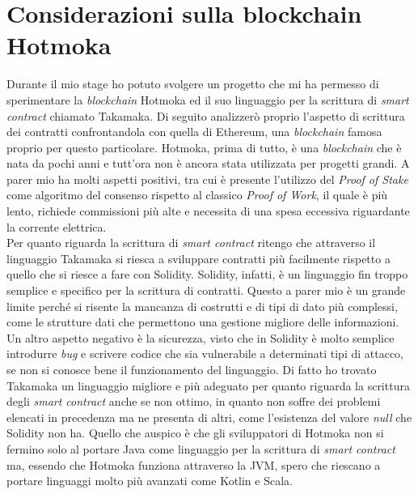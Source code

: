 
\section{Considerazioni sulla blockchain Hotmoka}
Durante il mio stage ho potuto svolgere un progetto che mi ha permesso di sperimentare la \textit{blockchain} Hotmoka ed il suo linguaggio per la scrittura di \textit{smart contract} chiamato Takamaka. Di seguito analizzerò proprio l'aspetto di scrittura dei contratti confrontandola con quella di Ethereum, una \textit{blockchain} famosa proprio per questo particolare. 
Hotmoka, prima di tutto, è una \textit{blockchain} che è nata da pochi anni e tutt'ora non è ancora stata utilizzata per progetti grandi. A parer mio ha molti aspetti positivi, tra cui è presente l'utilizzo del \textit{Proof of Stake} come algoritmo del consenso rispetto al classico \textit{Proof of Work}, il quale è più lento, richiede commissioni più alte e necessita di una spesa eccessiva riguardante la corrente elettrica. \\

Per quanto riguarda la scrittura di \textit{smart contract} ritengo che attraverso il linguaggio Takamaka si riesca a sviluppare contratti più facilmente rispetto a quello che si riesce a fare con Solidity. Solidity, infatti, è un linguaggio fin troppo semplice e specifico per la scrittura di contratti. Questo a parer mio è un grande limite perché si risente la mancanza di costrutti e di tipi di dato più complessi, come le strutture dati che permettono una gestione migliore delle informazioni. Un altro aspetto negativo è la sicurezza, visto che in Solidity è molto semplice introdurre \textit{bug} e scrivere codice che sia vulnerabile a determinati tipi di attacco, se non si conosce bene il funzionamento del linguaggio.
Di fatto ho trovato Takamaka un linguaggio migliore e più adeguato per quanto riguarda la scrittura degli \textit{smart contract} anche se non ottimo, in quanto non soffre dei problemi elencati in precedenza ma ne presenta di altri, come l'esistenza del valore \textit{null} che Solidity non ha. Quello che auspico è che gli sviluppatori di Hotmoka non si fermino solo al portare Java come linguaggio per la scrittura di \textit{smart contract} ma, essendo che Hotmoka funziona attraverso la JVM, spero che riescano a portare linguaggi molto più avanzati come Kotlin e Scala. \\

